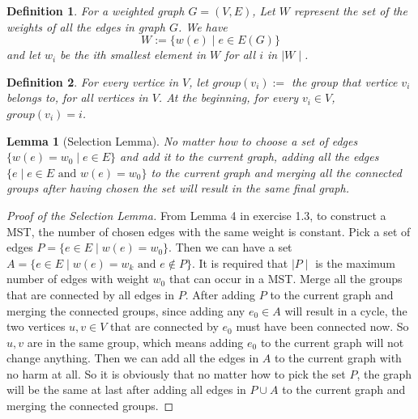 \documentclass[paper=a4, fontsize=11pt]{scrartcl} %
\numberwithin{figure}{section} %
\numberwithin{table}{section} %
\newtheorem{definition}{Definition}
\newtheorem*{lemma}{Lemma}
\begin{document}
	   \begin{definition}
			For a weighted graph $G = (V, E)$, Let $W$ represent the set of the weights of all the edges in graph $G$. We have
				\begin{displaymath}
					W := \{w(e) \mid e \in E(G)\}
				\end{displaymath}
			and let $w_i$ be the ith smallest element in $W$ for all $i$ in $\mid W \mid$.
		\end{definition}
		\begin{definition}
			For every vertice in $V$, let $group(v_i) := $ the group that vertice $v_i$ belongs to, for all vertices in $V$. At the beginning, for every $v_i \in V$, $group(v_i) = i$.
		\end{definition}
		\begin{lemma}[Selection Lemma]
			\label{lemma:add}
            No matter how to choose a set of edges $\{w(e) = w_0 \mid e \in E\}$ and add it to the current graph, adding all the edges $\{e \mid e \in E \textrm{ and } w(e) = w_0\}$ to the current graph and merging all the connected groups after having chosen the set will result in the same final graph.
		\end{lemma}
		\begin{proof}[Proof of the Selection Lemma]
			From Lemma 4 in exercise 1.3, to construct a MST, the number of chosen edges with the same weight is constant. Pick a set of edges $P = \{e \in E \mid w(e) = w_0\}$. Then we can have a set $A = \{e \in E \mid w(e) = w_k \textrm{ and } e \not\in P\}$. It is required that $\mid P \mid$ is the maximum number of edges with weight $w_0$ that can occur in a MST. Merge all the groups that are connected by all edges in $P$. After adding $P$ to the current graph and merging the connected groups, since adding any $e_0 \in A$ will result in a cycle, the two vertices $u, v \in V$ that are connected by $e_0$ must have been connected now. So $u, v$ are in the same group, which means adding $e_0$ to the current graph will not change anything. Then we can add all the edges in $A$ to the current graph with no harm at all. So it is obviously that no matter how to pick the set $P$, the graph will be the same at last after adding all edges in $P \cup A$ to the current graph and merging the connected groups.
		\end{proof}
\end{document}
